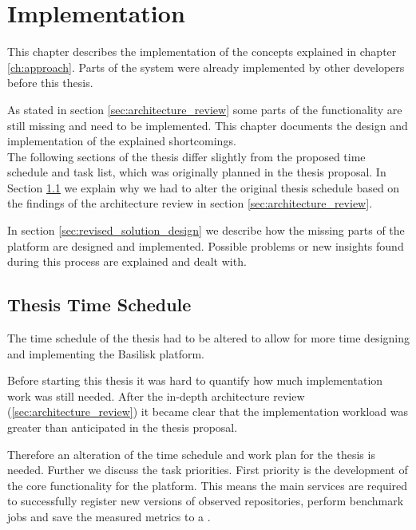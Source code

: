 \chapter{Implementation}
\label{ch:implementation}



This chapter describes the implementation of the concepts explained in chapter \ref{ch:approach}.
Parts of the system were already implemented by other developers before this thesis.

As stated in section \ref{sec:architecture_review} some parts of the functionality are still missing and need to be implemented.
This chapter documents the design and implementation of the explained shortcomings.
\\

The following sections of the thesis differ slightly from the proposed time schedule and task list, which was originally planned in the thesis proposal.
In Section \ref{sec:time_schedule} we explain why we had to alter the original thesis schedule based on the findings of the architecture review in section \ref{sec:architecture_review}.


In section \ref{sec:revised_solution_design} we describe how the missing parts of the platform are designed and implemented.
Possible problems or new insights found during this process are explained and dealt with.



\section{Thesis Time Schedule}
\label{sec:time_schedule}
The time schedule of the thesis had to be altered to allow for more time designing and implementing the Basilisk platform.

Before starting this thesis it was hard to quantify how much implementation work was still needed.
After the in-depth architecture review (\ref{sec:architecture_review}) it became clear that the implementation workload was greater than anticipated in the thesis proposal.

Therefore an alteration of the time schedule and work plan for the thesis is needed.
Further we discuss the task priorities.
First priority is the development of the core functionality for the platform.
This means the main services are required to successfully register new versions of observed repositories, perform benchmark jobs and save the measured metrics to a \ts{}.


